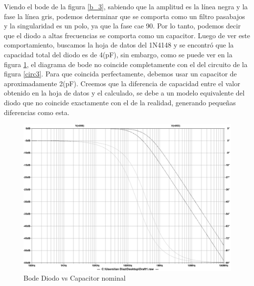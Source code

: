 Viendo el bode de la figura \ref{b_3}, sabiendo que la amplitud es
la l\'inea negra y la fase la l\'inea gris, podemos determinar que se
comporta como un filtro pasabajos y la singularidad es un polo, ya que la fase cae 90\textdegree .
Por lo tanto, podemos decir que el diodo a altas frecuencias se comporta
como un capacitor. Luego de ver este comportamiento, buscamos la hoja
de datos del 1N4148 y se encontr\'o que la capacidad total del diodo
es de 4(pF), sin embargo, como se puede ver en la figura \ref{b2_3},
el diagrama de bode no coincide completamente con el del circuito de la figura
\ref{circ3}. Para que coincida perfectamente, debemos usar un capacitor
de aproximadamente 2(pF). Creemos que la diferencia de capacidad entre
el valor obtenido en la hoja de datos y el calculado, se debe a un
modelo equivalente del diodo que no coincide exactamente con el
de la realidad, generando pequeñas diferencias como esta.

\begin{figure}[H]
\begin{centering}
\includegraphics[scale=0.2]{../EJ3/Bode2}
\par\end{centering}
\caption{Bode Diodo vs Capacitor nominal}
\label{b2_3}
\end{figure}










